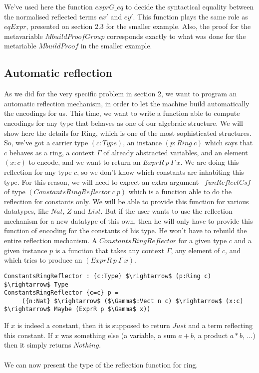 We've used here the function $exprG\_eq$ to decide the syntactical equality between the normalised reflected terms $ex'$ and $ey'$. This function plays the same role as $eqExpr$, presented on section 2.3 for the smaller example. Also, the proof for the metavariable $MbuildProofGroup$ corresponds exactly to what was done for the metariable $MbuildProof$ in the smaller example.


\subsection {Automatic reflection}

As we did for the very specific problem in section 2, we want to program an automatic reflection mechanism, in order to let the machine build automatically the encodings for us. This time, we want to write a function able to compute encodings for any type that behaves as one of our algebraic structure. We will show here the details for Ring, which is one of the most sophisticated structures. So, we've got a carrier type $(c:Type)$, an instance $(p:Ring\ c)$ which says that $c$ behaves as a ring, a context $\Gamma$ of already abstracted variables, and an element $(x:c)$ to encode, and we want to return an $ExprR\ p\ \Gamma\ x$.
We are doing this reflection for any type $c$, so we don't know which constants are inhabiting this type. For this reason, we will need to expect an extra argument --$funReflectCsf$-- of type $(ConstantsRingReflector\ c\ p)$ which is a function able to do the reflection for constants only. We will be able to provide this function for various datatypes, like $Nat$, $Z$ and $List$. But if the user wants to use the reflection mechanism for a new datatype of this own, then he will only have to provide this function of encoding for the constants of his type. He won't have to rebuild the entire reflection mechanism.
A $ConstantsRingReflector$ for a given type $c$ and a given instance $p$ is a function that takes any context $\Gamma$, any element of $c$, and which tries to produce an $(ExprR\ p\ \Gamma\ x)$.


\begin{lstlisting}
ConstantsRingReflector : {c:Type} $\rightarrow$ (p:Ring c) $\rightarrow$ Type
ConstantsRingReflector {c=c} p = 
     ({n:Nat} $\rightarrow$ ($\Gamma$:Vect n c) $\rightarrow$ (x:c) $\rightarrow$ Maybe (ExprR p $\Gamma$ x))
\end{lstlisting}


If $x$ is indeed a constant, then it is supposed to return $Just$ and a term reflecting this constant. If $x$ was something else (a variable, a sum $a+b$, a product $a*b$, ...) then it simply returns $Nothing$. \\
\\
We can now present the type of the reflection function for ring.


